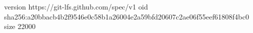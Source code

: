 version https://git-lfs.github.com/spec/v1
oid sha256:a20bbacb4b2f9546e0c58b1a26004e2a59bfd20607c2ae06f55eef61808f4bc0
size 22000
